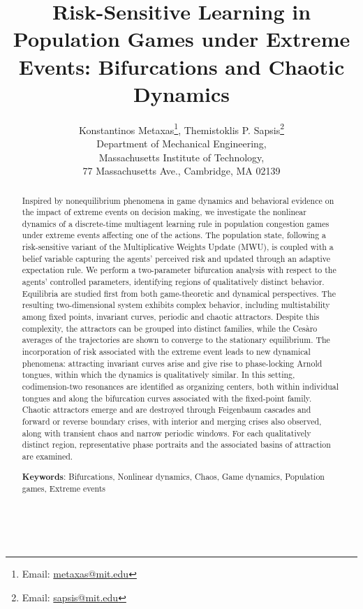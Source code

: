 \documentclass{article}
\title{Risk-Sensitive Learning in Population Games under Extreme Events: Bifurcations and Chaotic Dynamics}
\author{Konstantinos Metaxas\thanks{Email: \href{mailto:metaxas@mit.edu}{metaxas@mit.edu}}, Themistoklis P. Sapsis\thanks{Email: \href{mailto:sapsis@mit.edu}{sapsis@mit.edu}}\\
Department of Mechanical Engineering,
\\ Massachusetts Institute of Technology, \\
77 Massachusetts Ave., Cambridge, MA 02139\\
}
\date{}
\theoremstyle{plain}
\theoremstyle{definition}
\begin{document}
 \maketitle\ 
\begin{abstract}
Inspired by nonequilibrium phenomena in game dynamics and behavioral evidence on the impact of extreme events on decision making, we investigate the nonlinear dynamics of a discrete-time multiagent learning rule in population congestion games under extreme events affecting one of the actions. The population state, following a risk-sensitive variant of the Multiplicative Weights Update (MWU), is coupled with a belief variable capturing the agents' perceived risk and updated through an adaptive expectation rule. We perform a two-parameter bifurcation analysis with respect to the agents' controlled parameters, identifying regions of qualitatively distinct behavior. Equilibria are studied first from both game-theoretic and dynamical perspectives. The resulting two-dimensional system exhibits complex behavior, including multistability among fixed points, invariant curves, periodic and chaotic attractors. Despite this complexity, the attractors can be grouped into distinct families, while the Cesàro averages of the trajectories are shown to converge to the stationary equilibrium. The incorporation of risk associated with the extreme event leads to new dynamical phenomena: attracting invariant curves arise and give rise to phase-locking Arnold tongues, within which the dynamics is qualitatively similar. In this setting, codimension-two resonances are identified as organizing centers, both within individual tongues and along the bifurcation curves associated with the fixed-point family. Chaotic attractors emerge and are destroyed through Feigenbaum cascades and forward or reverse boundary crises, with interior and merging crises also observed, along with transient chaos and narrow periodic windows. For each qualitatively distinct region, representative phase portraits and the associated basins of attraction are examined.



\textbf{Keywords}: Bifurcations, Nonlinear dynamics, Chaos, Game dynamics, Population games, Extreme events
  
\end{abstract}
\end{document}
